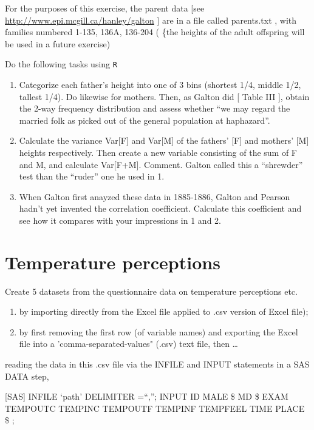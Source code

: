 \documentclass[]{book}
\begin{document}
For the purposes of this exercise, the parent data {[}see \url{http://www.epi.mcgill.ca/hanley/galton} {]} are in a file called parents.txt , with families numbered 1-135, 136A, 136-204 ( \{the heights of the adult offspring will be used in a future exercise)

Do the following tasks using \texttt{R}

\begin{enumerate}
\def\labelenumi{\arabic{enumi}.}
\item
  Categorize each father's height into one of 3 bins (shortest 1/4, middle 1/2, tallest 1/4). Do likewise for mothers. Then, as Galton did {[} Table III {]}, obtain the 2-way frequency distribution and assess whether ``we may regard the married folk as picked out of the general population at haphazard''.
\item
  Calculate the variance Var{[}F{]} and Var{[}M{]} of the fathers' {[}F{]} and mothers' {[}M{]} heights respectively. Then create a new variable consisting of the sum of F and M, and calculate Var{[}F+M{]}. Comment. Galton called this a ``shrewder'' test than the ``ruder'' one he used in 1.
\item
  When Galton first anayzed these data in 1885-1886, Galton and Pearson hadn't yet invented the correlation coefficient. Calculate this coefficient and see how it compares with your impressions in 1 and 2.
\end{enumerate}

\hypertarget{temperature-perceptions}{%
\section{Temperature perceptions}\label{temperature-perceptions}}

Create 5 datasets from the questionnaire data on temperature perceptions etc.

\begin{enumerate}
\def\labelenumi{(\roman{enumi})}
\item
  by importing directly from the Excel file applied to .csv version of Excel file);
\item
  by first removing the first row (of variable names) and exporting the Excel file into a 'comma-separated-values" (.csv) text file, then \ldots{}
\end{enumerate}

reading the data in this .csv file via the INFILE and INPUT statements in a SAS DATA step,

{[}SAS{]}
INFILE `path' DELIMITER =``,'';
INPUT ID MALE \$ MD \$ EXAM TEMPOUTC TEMPINC TEMPOUTF TEMPINF TEMPFEEL TIME PLACE \$ ;
\end{document}

